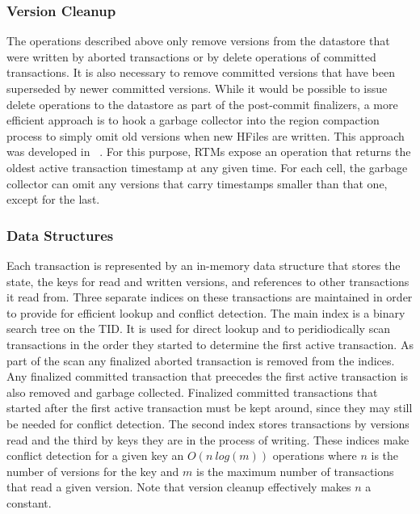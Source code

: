 \documentclass[10pt,final,journal]{IEEEtran}
\begin{document}
\subsubsection{Version Cleanup}
The operations described above only remove versions from the datastore that were written by aborted transactions or by delete operations of committed transactions. It is also necessary to remove committed versions that have been superseded by newer committed versions. While it would be possible to issue delete operations to the datastore as part of the post-commit finalizers, a more efficient approach is to hook a garbage collector into the region compaction process to simply omit old versions when new HFiles are written. This approach was developed in ~\cite{Junqueira:2011:LTS:2056318.2057148}. For this purpose, RTMs expose an operation that returns the oldest active transaction timestamp at any given time. For each cell, the garbage collector can omit any versions that carry timestamps smaller than that one, except for the last.

\subsubsection{Data Structures}
Each transaction is represented by an in-memory data structure that stores the state, the keys for read and written versions, and references to other transactions it read from. Three separate indices on these transactions are maintained in order to provide for efficient lookup and conflict detection. The main index is a binary search tree on the TID. It is used for direct lookup and to peridiodically scan transactions in the order they started to determine the first active transaction. As part of the scan any finalized aborted transaction is removed from the indices. Any finalized committed transaction that preecedes the first active transaction is also removed and garbage collected. Finalized committed transactions that started after the first active transaction must be kept around, since they may still be needed for conflict detection. The second index stores transactions by versions read and the third by keys they are in the process of writing. These indices make conflict detection for a given key an $O(n \: log(m))$ operations where $n$ is the number of versions for the key and $m$ is the maximum number of transactions that read a given version. Note that version cleanup effectively makes $n$ a constant.
\end{document}
